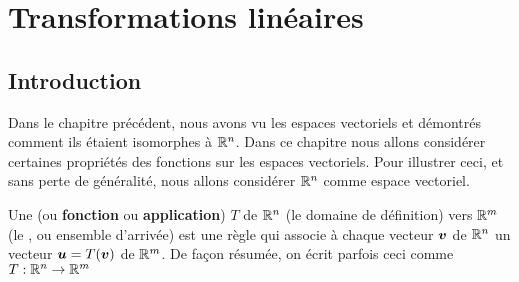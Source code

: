 \chapter{Transformations linéaires}

\newcommand{\CoordInitiales}{%
	\coordinate (A0) at (0, 0);
	\coordinate (B0) at (0, 1);
	\coordinate (C0) at (1, 0);
	\coordinate (D0) at (1, 1);
}%

\newcommand{\DessinerAxes}{
	\draw[->] (-1.5,0) -- (2.5,0) node[anchor=west]{x};
	\draw[->] (0,-1.5) -- (0,2.5) node[anchor=south]{y};
	\draw[-] (1, -0.1) node[anchor=north]{\tiny 1} -- (1, 0.1);
	\draw[-] (-0.1, 1) node[anchor=east]{\tiny 1} -- (0.1, 1);
	\draw[-] (-1, -0.1) node[anchor=north]{\tiny -1} -- (-1, 0.1);
	\draw[-] (-0.1, -1) node[anchor=east]{\tiny -1} -- (0.1, -1);
	\draw[-] (2, -0.1) node[anchor=north]{\tiny 2} -- (2, 0.1);
	\draw[-] (-0.1, 2) node[anchor=east]{\tiny 2} -- (0.1, 2);
	\draw [black] (A0) circle (2pt);
	\draw [red] (B0) circle (2pt);
	\draw [green] (C0) circle (2pt);
	\draw [blue] (D0) circle (2pt);
}%

\newcommand{\FigureInitiale}{
\CoordInitiales
\path [fill=blue!10] (A0) -- (B0) -- (D0) -- (C0) -- (A0);
\DessinerAxes
}

\newcommand{\FigureFinale}{
    \CoordInitiales
    \path [fill=blue!10] (A0) -- (B0) -- (D0) -- (C0) -- (A0);
    \path [pattern=north east lines, pattern color=blue] (A) -- (B) -- (D) -- (C) -- (A);
    \DessinerAxes
	\fill [black] (A) circle (2pt);
	\fill [red] (B) circle (2pt);
	\fill [green] (C) circle (2pt);
	\fill [blue] (D) circle (2pt);
}
\section{Introduction}
Dans le chapitre précédent, nous avons vu les espaces vectoriels et démontrés comment ils
étaient isomorphes à $\mathbb{R}^n$.  Dans ce chapitre nous allons considérer certaines
propriétés des fonctions sur les espaces vectoriels. Pour illustrer ceci, et sans perte de généralité,
nous allons considérer $\mathbb{R}^n$ comme espace vectoriel.
\begin{defini}
Une  (ou \textbf{fonction} ou \textbf{application}) $T$ de $\mathbb{R}^n$ 
(le domaine de définition) vers $\mathbb{R}^m$ (le , ou ensemble d'arrivée)
est une règle qui associe à chaque vecteur $\boldsymbol{v}$ de $\mathbb{R}^n$ un vecteur $\boldsymbol{u} = T(\boldsymbol{v})$ de $\mathbb{R}^m$.
De façon résumée, on écrit parfois ceci comme 
$
T: \mathbb{R}^n \rightarrow \mathbb{R}^m
$
\end{defini}

